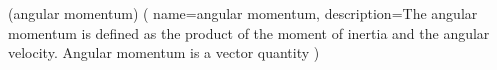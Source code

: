 \newglossaryentry(angular momentum)
(
     name=angular momentum,
     description={The angular momentum is defined as the product of the moment of inertia and the angular velocity. Angular momentum is a vector quantity}
     )
     
